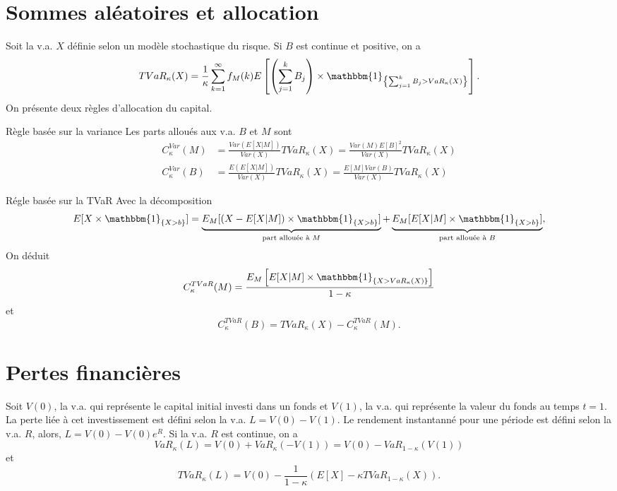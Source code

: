 \section{Sommes aléatoires et allocation}

Soit la v.a. $X$ définie selon un modèle stochastique du risque. Si $B$ est continue et positive, on a 
$$TVaR_\kappa(X) = \frac{1}{\kappa}\sum_{k = 1}^{\infty} f_M(k) E\left[ \left(\sum_{j = 1}^{k}B_j\right)\times \mathbbm{1}_{\left\{\sum_{j = 1}^{k}B_j > VaR_\kappa(X)\right\}}\right].$$
On présente deux règles d'allocation du capital. 

\begin{definition}{Règle basée sur la variance}{}
	Les parts alloués aux v.a. $B$ et $M$ sont
	\begin{align*}
	C_\kappa^{Var}(M) &= \frac{Var(E[X\vert M])}{Var(X)} TVaR_\kappa(X) = \frac{Var(M)E[B]^2}{Var(X)} TVaR_\kappa(X)\\
	C_\kappa^{Var}(B) &= \frac{E(E[X\vert M])}{Var(X)} TVaR_\kappa(X) = \frac{E[M]Var(B)}{Var(X)} TVaR_\kappa(X)
	\end{align*}
\end{definition}

\begin{definition}{Régle basée sur la TVaR}{}
	Avec la décomposition 
	$$E[X \times \mathbbm{1}_{\{X>b\}}] = \underbrace{E_M[(X - E[X\vert M])\times \mathbbm{1}_{\{X>b\}}]}_{\text{part allouée à }M} + \underbrace{E_M[E[X\vert M]\times \mathbbm{1}_{\{X>b\}}]}_{\text{part allouée à }B},$$
	On déduit
	$$C_\kappa^{TVaR}(M) = \frac{E_M\left[E[X \vert M] \times \mathbbm{1}_{\{X>VaR_\kappa(X)\}}\right]}{1 - \kappa}$$
	et
	$$C_\kappa^{TVaR}(B) = TVaR_\kappa(X) - C_\kappa^{TVaR}(M).$$
\end{definition}

\section{Pertes financières}

\begin{definition}{}{}
	Soit $V(0)$, la v.a. qui représente le capital initial investi dans un fonds et $V(1)$, la v.a. qui représente la valeur du fonds au temps $t = 1$. La perte liée à cet investissement est défini selon la v.a. $L = V(0) - V(1)$. Le rendement instantanné pour une période est défini selon la v.a. $R$, alors, $L = V(0) - V(0)e^R$. Si la v.a. $R$ est continue, on a 
	$$VaR_\kappa(L) = V(0) + VaR_\kappa(-V(1)) = V(0) - VaR_{1 - \kappa}(V(1))$$
	et
	$$TVaR_\kappa(L) = V(0) - \frac{1}{1 - \kappa} \left(E[X]-\kappa TVaR_{1 - \kappa}(X)\right).$$
\end{definition}